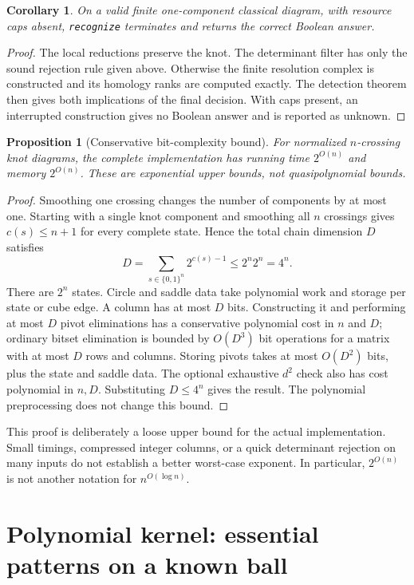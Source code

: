 \documentclass[11pt]{article}
\newtheorem{proposition}[theorem]{Proposition}
\newtheorem{corollary}[theorem]{Corollary}
\theoremstyle{definition}
\newcommand{\code}[1]{\texttt{#1}}
\begin{document}
\begin{corollary}
On a valid finite one-component classical diagram, with resource caps absent,
\code{recognize} terminates and returns the correct Boolean answer.
\end{corollary}
\begin{proof}
The local reductions preserve the knot. The determinant filter has only the
sound rejection rule given above. Otherwise the finite resolution complex is
constructed and its homology ranks are computed exactly. The detection theorem
then gives both implications of the final decision. With caps present, an
interrupted construction gives no Boolean answer and is reported as unknown.
\end{proof}

\begin{proposition}[Conservative bit-complexity bound]
For normalized $n$-crossing knot diagrams, the complete implementation has
running time $2^{O(n)}$ and memory $2^{O(n)}$. These are exponential upper bounds,
not quasipolynomial bounds.
\end{proposition}
\begin{proof}
Smoothing one crossing changes the number of components by at most one.
Starting with a single knot component and smoothing all $n$ crossings gives
$c(s)\le n+1$ for every complete state. Hence the total chain dimension $D$
satisfies
\[
 D=\sum_{s\in\{0,1\}^n}2^{c(s)-1}\le 2^n2^n=4^n.
\]
There are $2^n$ states. Circle and saddle data take polynomial work and storage
per state or cube edge. A column has at most $D$ bits. Constructing it and
performing at most $D$ pivot eliminations has a conservative polynomial cost in
$n$ and $D$; ordinary bitset elimination is bounded by $O(D^3)$ bit operations
for a matrix with at most $D$ rows and columns. Storing pivots takes at most
$O(D^2)$ bits, plus the state and saddle data. The optional exhaustive $d^2$
check also has cost polynomial in $n,D$. Substituting $D\le4^n$ gives the result.
The polynomial preprocessing does not change this bound.
\end{proof}

This proof is deliberately a loose upper bound for the actual implementation.
Small timings, compressed integer columns, or a quick determinant rejection on
many inputs do not establish a better worst-case exponent. In particular,
$2^{O(n)}$ is not another notation for $n^{O(\log n)}$.

\section{Polynomial kernel: essential patterns on a known ball}
\end{document}
